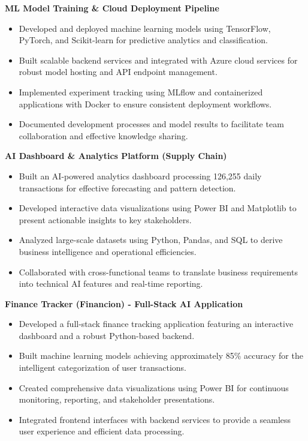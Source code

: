 \documentclass[a4paper,10pt]{article}
\begin{document}
\vspace{5pt}

\noindent \textbf{ ML Model Training \& Cloud Deployment Pipeline }
\begin{itemize}
    \item Developed and deployed machine learning models using TensorFlow, PyTorch, and Scikit-learn for predictive analytics and classification.
    \item Built scalable backend services and integrated with Azure cloud services for robust model hosting and API endpoint management.
    \item Implemented experiment tracking using MLflow and containerized applications with Docker to ensure consistent deployment workflows.
    \item Documented development processes and model results to facilitate team collaboration and effective knowledge sharing.
\end{itemize}

\vspace{5pt}

\noindent \textbf{ AI Dashboard \& Analytics Platform (Supply Chain) }
\begin{itemize}
    \item Built an AI-powered analytics dashboard processing 126,255 daily transactions for effective forecasting and pattern detection.
    \item Developed interactive data visualizations using Power BI and Matplotlib to present actionable insights to key stakeholders.
    \item Analyzed large-scale datasets using Python, Pandas, and SQL to derive business intelligence and operational efficiencies.
    \item Collaborated with cross-functional teams to translate business requirements into technical AI features and real-time reporting.
\end{itemize}

\vspace{5pt}

\noindent \textbf{ Finance Tracker (Financion) - Full-Stack AI Application }
\begin{itemize}
    \item Developed a full-stack finance tracking application featuring an interactive dashboard and a robust Python-based backend.
    \item Built machine learning models achieving approximately 85\% accuracy for the intelligent categorization of user transactions.
    \item Created comprehensive data visualizations using Power BI for continuous monitoring, reporting, and stakeholder presentations.
    \item Integrated frontend interfaces with backend services to provide a seamless user experience and efficient data processing.
\end{itemize}
\end{document}
